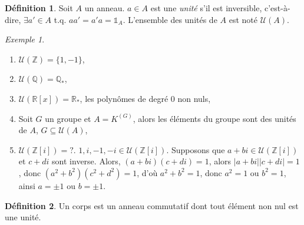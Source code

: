 \documentclass{report}
\theoremstyle{definition}
\newtheorem*{dfn}{D\'efinition}
\theoremstyle{remark}
\newtheorem*{exem}{Exemple}
\def\ZZ{\mathbb{Z}}
\def\QQ{\mathbb{Q}}
\def\RR{\mathbb{R}}
\def\id{\mathds{1}}
\newcommand*{\abs}[1]{\left|#1\right|}
\begin{document}
	\begin{dfn}
		Soit $A$ un anneau. $a \in A$ est une \emph{unit\'e} s'il est inversible, c'est-\`a-dire, $\exists a'\in A$ t.q. $aa'=a'a=\id_A$. L'ensemble des unit\'es de $A$ est not\'e $\mathcal{U}(A)$.
	\end{dfn}

	\begin{exem}
		\begin{enumerate}
			\item $\mathcal{U}(\ZZ) = \{1,-1\}$,
			\item $\mathcal{U}(\QQ) = \QQ_*$,
			\item $\mathcal{U}(\RR[x]) = \RR_*$, les polyn\^omes de degr\'e $0$ non nuls,
			\item Soit $G$ un groupe et $A=K^{(G)}$, alors les \'el\'ements du groupe sont des unit\'es de $A$, $G \subseteq \mathcal{U}(A)$,
			\item $\mathcal{U}(\ZZ[i]) = ?$. $1,i,-1,-i \in \mathcal{U}(\ZZ[i])$. Supposons que $a+bi \in \mathcal{U}(\ZZ[i])$ et $c+di$ sont inverse. Alors, $(a+bi)(c+di)=1$, alors $\abs{a+bi} \abs{c+di}=1$, donc $(a^2+b^2)(c^2+d^2)=1$, d'o\`u $a^2+b^2=1$, donc $a^2=1$ ou $b^2=1$, ainsi $a=\pm1$ ou $b=\pm1$.
		\end{enumerate}
	\end{exem}

	\begin{dfn}
		Un corps est un anneau commutatif dont tout \'el\'ement non nul est une unit\'e.
	\end{dfn}
\end{document}
